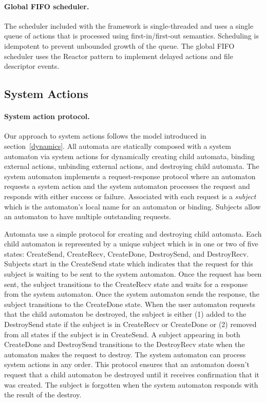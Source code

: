 \paragraph{Global FIFO scheduler.}
The scheduler included with the framework is single-threaded and uses a single queue of actions that is processed using first-in/first-out semantics.
Scheduling is idempotent to prevent unbounded growth of the queue.
The global FIFO scheduler uses the Reactor pattern to implement delayed actions and file descriptor events.

\subsection{System Actions}

\paragraph{System action protocol.}
Our approach to system actions follows the model introduced in section~\ref{dynamics}.
All automata are statically composed with a system automaton via system actions for dynamically creating child automata, binding external actions, unbinding external actions, and destroying child automata.
The system automaton implements a request-response protocol where an automaton requests a system action and the system automaton processes the request and responds with either success or failure.
Associated with each request is a \emph{subject} which is the automaton's local name for an automaton or binding.
Subjects allow an automaton to have multiple outstanding requests.

Automata use a simple protocol for creating and destroying child automata.
Each child automaton is represented by a unique subject which is in one or two of five states: CreateSend, CreateRecv, CreateDone, DestroySend, and DestroyRecv.
Subjects start in the CreateSend state which indicates that the request for this subject is waiting to be sent to the system automaton.
Once the request has been sent, the subject transitions to the CreateRecv state and waits for a response from the system automaton.
Once the system automaton sends the response, the subject transitions to the CreateDone state.
When the user automaton requests that the child automaton be destroyed, the subject is either (1) added to the DestroySend state if the subject is in CreateRecv or CreateDone or (2) removed from all states if the subject is in CreateSend.
A subject appearing in both CreateDone and DestroySend transitions to the DestroyRecv state when the automaton makes the request to destroy.
The system automaton can process system actions in any order.
This protocol ensures that an automaton doesn't request that a child automaton be destroyed until it receives confirmation that it was created.
The subject is forgotten when the system automaton responds with the result of the destroy.

